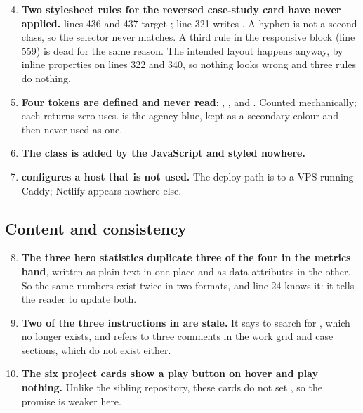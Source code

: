 \documentclass[11pt,a4paper]{article}
\begin{document}
\begin{enumerate}\setcounter{enumi}{3}
\item \textbf{Two stylesheet rules for the reversed case-study card have never
  applied.}  lines 436 and 437 target ;
   line 321 writes .
  A hyphen is not a second class, so the selector never matches. A third rule in
  the responsive block (line 559) is dead for the same reason. The intended layout
  happens anyway, by inline  properties on lines 322 and 340, so
  nothing looks wrong and three rules do nothing.
\item \textbf{Four tokens are defined and never read}: ,
  ,  and . Counted mechanically; each
  returns zero uses.  is the agency blue, kept as a secondary
  colour and then never used as one.
\item \textbf{The class  is added by the JavaScript and styled
  nowhere.}
\item \textbf{ configures a host that is not used.} The deploy
  path is  to a VPS running Caddy; Netlify appears nowhere else.
\end{enumerate}

\subsection{Content and consistency}

\begin{enumerate}\setcounter{enumi}{7}
\item \textbf{The three hero statistics duplicate three of the four in the metrics
  band}, written as plain text in one place and as data attributes in the other. So
  the same numbers exist twice in two formats, and  line 24 knows
  it: it tells the reader to update both.
\item \textbf{Two of the three instructions in  are stale.} It
  says to search for , which no longer exists, and refers to
  three  comments in the work grid and case sections, which
  do not exist either.
\item \textbf{The six project cards show a play button on hover and play
  nothing.} Unlike the sibling repository, these cards do not set
  , so the promise is weaker here.
\end{enumerate}
\end{document}

